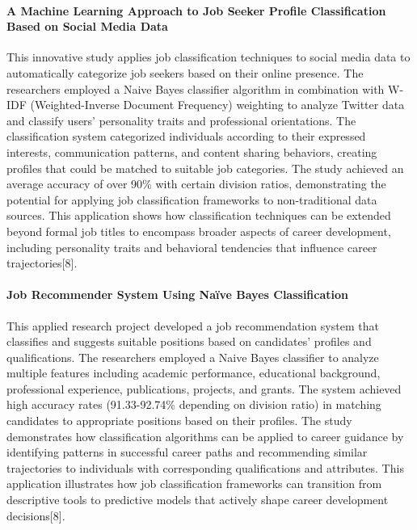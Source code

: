 \documentclass[./main.tex]{subfiles}
\begin{document}
\paragraph{A Machine Learning Approach to Job Seeker Profile
Classification Based on Social Media
Data}\label{a-machine-learning-approach-to-job-seeker-profile-classification-based-on-social-media-data}

This innovative study applies job classification techniques to social
media data to automatically categorize job seekers based on their online
presence. The researchers employed a Naive Bayes classifier algorithm in
combination with W-IDF (Weighted-Inverse Document Frequency) weighting
to analyze Twitter data and classify users' personality traits and
professional orientations. The classification system categorized
individuals according to their expressed interests, communication
patterns, and content sharing behaviors, creating profiles that could be
matched to suitable job categories. The study achieved an average
accuracy of over 90\% with certain division ratios, demonstrating the
potential for applying job classification frameworks to non-traditional
data sources. This application shows how classification techniques can
be extended beyond formal job titles to encompass broader aspects of
career development, including personality traits and behavioral
tendencies that influence career trajectories{[}8{]}.

\paragraph{Job Recommender System Using Naïve Bayes
Classification}\label{job-recommender-system-using-nauxefve-bayes-classification}

This applied research project developed a job recommendation system that
classifies and suggests suitable positions based on candidates' profiles
and qualifications. The researchers employed a Naive Bayes classifier to
analyze multiple features including academic performance, educational
background, professional experience, publications, projects, and grants.
The system achieved high accuracy rates (91.33-92.74\% depending on
division ratio) in matching candidates to appropriate positions based on
their profiles. The study demonstrates how classification algorithms can
be applied to career guidance by identifying patterns in successful
career paths and recommending similar trajectories to individuals with
corresponding qualifications and attributes. This application
illustrates how job classification frameworks can transition from
descriptive tools to predictive models that actively shape career
development decisions{[}8{]}.
\end{document}
